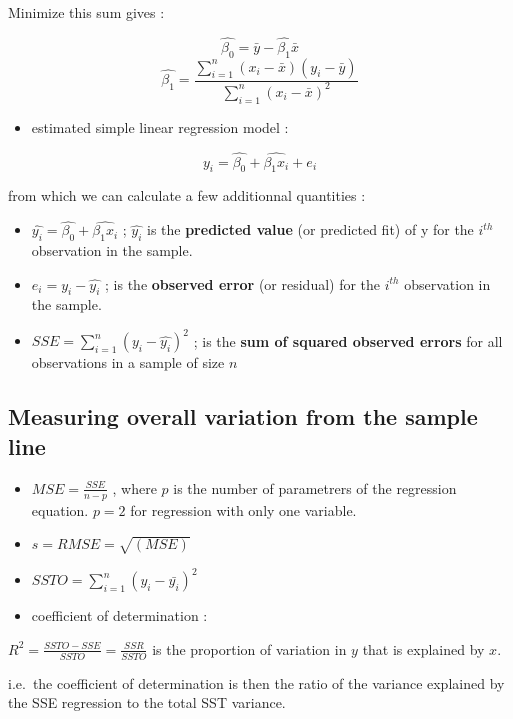 \documentclass[
]{report}
\providecommand{\tightlist}{%
  \setlength{\itemsep}{0pt}\setlength{\parskip}{0pt}}
\begin{document}
Minimize this sum gives :

\[\hat{\beta_0}= \bar{y} - \hat{\beta_1}\bar{x}\]
\[\hat{\beta_1}= \frac{\sum_{i=1}^n(x_i -\bar{x})(y_i -\bar{y})}{\sum_{i=1}^n(x_i -\bar{x})^2}\]

\begin{itemize}
\tightlist
\item
  estimated simple linear regression model :
\end{itemize}

\[y_i = \hat{\beta_0} + \hat{\beta_1x_i} +  e_i\]

from which we can calculate a few additionnal quantities :

\begin{itemize}
\item
  \(\hat{y_i} = \hat{\beta_0} + \hat{\beta_1x_i}\) ; \(\hat{y_i}\) is the \textbf{predicted value} (or predicted fit) of y for the \(i^{th}\) observation in the sample.
\item
  \(e_i=y_i -\hat{y_i}\) ; is the \textbf{observed error} (or residual) for the \(i^{th}\) observation in the sample.
\item
  \(SSE = \sum_{i=1}^n (y_i -\hat{y_i})^2\) ; is the \textbf{sum of squared observed errors} for all observations in a sample of size \(n\)
\end{itemize}

\hypertarget{measuring-overall-variation-from-the-sample-line}{%
\subsection{Measuring overall variation from the sample line}\label{measuring-overall-variation-from-the-sample-line}}

\begin{itemize}
\item
  \(MSE = \frac{SSE}{n-p}\) , where \(p\) is the number of parametrers of the regression equation. \(p=2\) for regression with only one variable.
\item
  \(s = RMSE = \sqrt{(MSE)}\)
\item
  \(SSTO=\sum_{i=1}^n (y_i -\bar{y_i})^2\)
\item
  coefficient of determination :
\end{itemize}

\(R^2 = \frac{SSTO-SSE}{SSTO} = \frac{SSR}{SSTO}\) is the proportion of variation in \(y\) that is explained by \(x\).

i.e.~the coefficient of determination is then the ratio of the variance explained by the SSE regression to the total SST variance.
\end{document}
